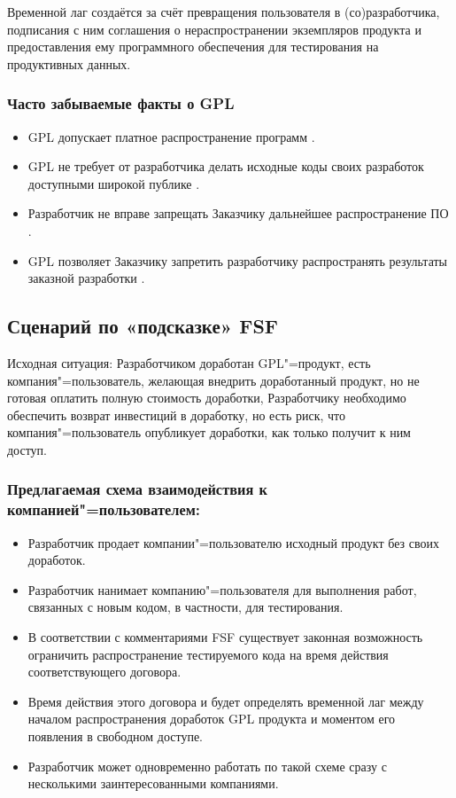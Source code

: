 \documentclass[10pt, a5paper]{article}
\begin{document}
Временной лаг создаётся за счёт превращения пользователя в (со)разработчика, подписания с ним соглашения о нераспространении экземпляров продукта и предоставления ему программного обеспечения для тестирования на продуктивных данных.

\subsubsection*{Часто забываемые факты о GPL}

\begin{itemize}
  \item GPL допускает платное распространение программ \cite{ryabikov1}.
  \item GPL не требует от разработчика делать исходные коды своих разработок доступными широкой публике \cite{ryabikov2}.
  \item Разработчик не вправе запрещать Заказчику дальнейшее распространение ПО \cite{ryabikov3, ryabikov4}.
  \item GPL позволяет Заказчику запретить разработчику распространять результаты заказной разработки  \cite{ryabikov5}.
\end{itemize}

\subsection*{Сценарий по «подсказке» FSF}

Исходная ситуация: Разработчиком доработан GPL"=продукт, \linebreak есть компания"=пользователь, желающая внедрить доработанный \linebreak продукт, но не готовая оплатить полную стоимость доработки, Разработчику необходимо обеспечить возврат инвестиций в доработку, но есть риск, что компания"=пользователь опубликует доработки, как только получит к ним доступ.

\subsubsection*{Предлагаемая схема взаимодействия к компанией"=пользователем:}

\begin{itemize}
  \item Разработчик продает компании"=пользователю исходный продукт без своих доработок.
  \item Разработчик нанимает компанию"=пользователя для выполнения работ, связанных с новым кодом, в частности, для тестирования.
  \item В соответствии с комментариями FSF \cite{ryabikov5} существует законная возможность ограничить распространение тестируемого кода на время действия соответствующего договора.
  \item Время действия этого договора и будет определять временной лаг между началом распространения доработок GPL продукта и моментом его появления в свободном доступе.
  \item Разработчик может одновременно работать по такой схеме сразу с несколькими заинтересованными компаниями.
\end{itemize}
\end{document}
